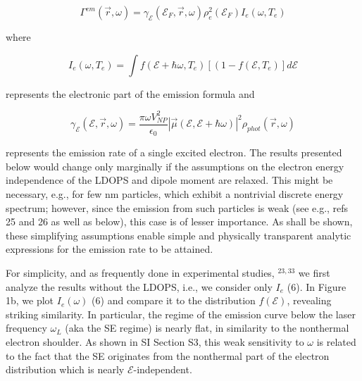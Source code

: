 \documentclass[10pt]{article}
\begin{document}
\begin{equation*}
\Gamma^{e m}(\vec{r}, \omega)=\gamma_{\mathcal{E}}\left(\mathcal{E}_{F}, \vec{r}, \omega\right) \rho_{e}^{2}\left(\mathcal{E}_{F}\right) I_{e}\left(\omega, T_{e}\right) \tag{5}
\end{equation*}


where


\begin{equation*}
I_{e}\left(\omega, T_{e}\right)=\int f\left(\mathcal{E}+\hbar \omega, T_{e}\right)\left[\left(1-f\left(\mathcal{E}, T_{e}\right)\right] d \mathcal{E}\right. \tag{6}
\end{equation*}


represents the electronic part of the emission formula and


\begin{equation*}
\gamma_{\mathcal{E}}(\mathcal{E}, \vec{r}, \omega)=\frac{\pi \omega V_{N P}^{2}}{\epsilon_{0}}|\vec{\mu}(\mathcal{E}, \mathcal{E}+\hbar \omega)|^{2} \rho_{p h o t}(\vec{r}, \omega) \tag{7}
\end{equation*}


represents the emission rate of a single excited electron. The results presented below would change only marginally if the assumptions on the electron energy independence of the LDOPS and dipole moment are relaxed. This might be necessary, e.g., for few nm particles, which exhibit a nontrivial discrete energy spectrum; however, since the emission from such particles is weak (see e.g., refs 25 and 26 as well as below), this case is of lesser importance. As shall be shown, these simplifying assumptions enable simple and physically transparent analytic expressions for the emission rate to be attained.

For simplicity, and as frequently done in experimental studies, ${ }^{23,33}$ we first analyze the results without the LDOPS, i.e., we consider only $I_{e}$ (6). In Figure 1b, we plot $I_{e}(\omega)$ (6) and compare it to the distribution $f(\mathcal{E})$, revealing striking similarity. In particular, the regime of the emission curve below the laser frequency $\omega_{L}$ (aka the SE regime) is nearly flat, in similarity to the nonthermal electron shoulder. As shown in SI Section S3, this weak sensitivity to $\omega$ is related to the fact that the SE originates from the nonthermal part of the electron distribution which is nearly $\mathcal{E}$-independent.
\end{document}
